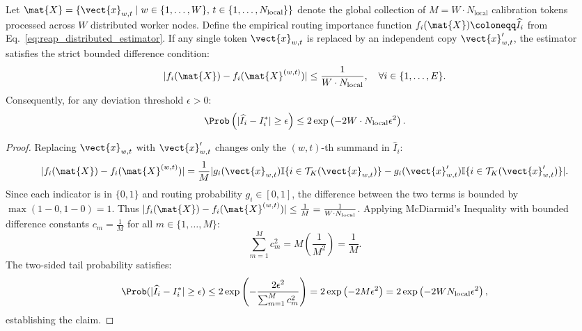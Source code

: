 \begin{lemma}
\label{lem:mcdiarmid_distributed_allreduce}
Let $\mat{X} = \{\vect{x}_{w,t} \mid w \in \{1, \dots, W\}, \, t \in \{1, \dots, N_{\text{local}}\}\}$ denote the global collection of $M = W \cdot N_{\text{local}}$ calibration tokens processed across $W$ distributed worker nodes.
Define the empirical routing importance function $f_i(\mat{X}) \coloneqq \widehat{I}_i$ from Eq.~\eqref{eq:reap_distributed_estimator}.
If any single token $\vect{x}_{w,t}$ is replaced by an independent copy $\vect{x}'_{w,t}$, the estimator satisfies the strict bounded difference condition:
\begin{equation}
|f_i(\mat{X}) - f_i(\mat{X}^{(w,t)})| \le \frac{1}{W \cdot N_{\text{local}}}, \quad \forall i \in \{1, \dots, E\}.
\label{eq:mcdiarmid_step_bound}
\end{equation}
Consequently, for any deviation threshold $\epsilon > 0$:
\begin{equation}
\Prob\left( |\widehat{I}_i - I_i^*| \ge \epsilon \right) \le 2 \exp\left( -2 W \cdot N_{\text{local}} \epsilon^2 \right).
\label{eq:reap_mcdiarmid_bound}
\end{equation}
\end{lemma}

\begin{proof}
Replacing $\vect{x}_{w,t}$ with $\vect{x}'_{w,t}$ changes only the $(w, t)$-th summand in $\widehat{I}_i$:
\begin{equation}
|f_i(\mat{X}) - f_i(\mat{X}^{(w,t)})| = \frac{1}{M} |g_i(\vect{x}_{w,t}) \mathbb{I}\{i \in \mathcal{T}_K(\vect{x}_{w,t})\} - g_i(\vect{x}'_{w,t}) \mathbb{I}\{i \in \mathcal{T}_K(\vect{x}'_{w,t})\}|.
\end{equation}
Since each indicator is in $\{0, 1\}$ and routing probability $g_i \in [0, 1]$, the difference between the two terms is bounded by $\max(1 - 0, 1 - 0) = 1$.
Thus $|f_i(\mat{X}) - f_i(\mat{X}^{(w,t)})| \le \frac{1}{M} = \frac{1}{W \cdot N_{\text{local}}}$.
Applying McDiarmid's Inequality with bounded difference constants $c_m = \frac{1}{M}$ for all $m \in \{1, \dots, M\}$:
\begin{equation}
\sum_{m=1}^M c_m^2 = M \left( \frac{1}{M^2} \right) = \frac{1}{M}.
\end{equation}
The two-sided tail probability satisfies:
\begin{equation}
\Prob(|\widehat{I}_i - I_i^*| \ge \epsilon) \le 2 \exp\left( -\frac{2 \epsilon^2}{\sum_{m=1}^M c_m^2} \right) = 2 \exp\left( -2 M \epsilon^2 \right) = 2 \exp\left( -2 W N_{\text{local}} \epsilon^2 \right),
\end{equation}
establishing the claim.
\end{proof}

